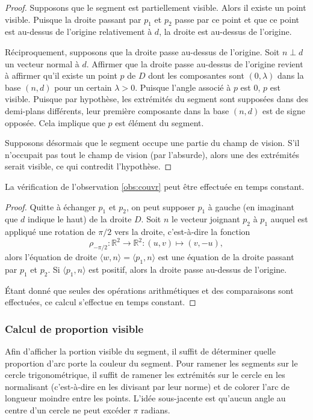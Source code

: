 \begin{proof}
  Supposons que le segment est partiellement visible. Alors il existe
  un point visible. Puisque la droite passant par $p_1$ et $p_2$ passe
  par ce point et que ce point est au-dessus de l'origine relativement
  à $d$, la droite est au-dessus de l'origine.


  Réciproquement, supposons que la droite passe au-dessus de l'origine.
  Soit $n\perp d$ un vecteur normal à $d$. Affirmer que la droite passe
  au-dessus de l'origine revient à affirmer qu'il existe un point $p$ de $D$
  dont les composantes sont $(0, \lambda)$ dans la base $(n, d)$ pour
  un certain $\lambda>0$. Puisque l'angle associé à $p$ est $0$, $p$
  est visible. Puisque par hypothèse, les extrémités du segment sont
  supposées dans des demi-plans différents, leur première composante
  dans la base $(n, d)$ est de signe opposée. Cela implique que $p$
  est élément du segment.

  Supposons désormais que le segment occupe une partie du champ de vision.
  S'il n'occupait pas tout le champ de vision (par l'absurde), alors
  une des extrémités serait visible, ce qui contredit l'hypothèse.
\end{proof}
\begin{lem}
  La vérification de l'observation \ref{obs:couvr} peut être effectuée en
  temps constant.
\end{lem}
\begin{proof}
  Quitte à échanger $p_1$ et $p_2$, on peut supposer $p_1$ à gauche
  (en imaginant que $d$ indique le haut) de la droite $D$.
  Soit $n$ le vecteur joignant $p_2$ à $p_1$ auquel est appliqué
  une rotation de $\pi/2$ vers la droite, c'est-à-dire la fonction
  $$ \rho_{-\pi/2}:\mathbb R^2\to\mathbb R^2: (u, v)\mapsto (v, -u),$$
  alors l'équation de droite $\langle w, n\rangle = \langle p_1, n\rangle$
  est une équation de la droite passant par $p_1$ et $p_2$.
  Si $\langle p_1, n\rangle$ est positif, alors la droite passe au-dessus
  de l'origine.

  \'Etant donné que seules des opérations arithmétiques et des comparaisons
  sont effectuées, ce calcul s'effectue en temps constant.
\end{proof}

\subsubsection{Calcul de proportion visible}
Afin d'afficher la portion visible du segment,
il suffit de déterminer quelle proportion d'arc  porte la couleur du segment.
Pour ramener les segments sur le cercle trigonométrique, il suffit
de ramener les extrémités sur le cercle en les normalisant (c'est-à-dire en
les divisant par leur norme) et
de colorer l'arc de longueur moindre entre les points.
L'idée sous-jacente est qu'aucun angle au centre d'un cercle ne
peut excéder $\pi$ radians.


